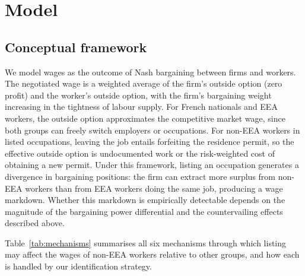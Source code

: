 \documentclass[9pt]{article}
\begin{document}
\section{Model}
\label{sec:model}

\subsection{Conceptual framework}

We model wages as the outcome of Nash bargaining between firms and workers.
The negotiated wage is a weighted average of the firm's outside option (zero profit)
and the worker's outside option, with the firm's bargaining weight increasing in the
tightness of labour supply. For French nationals and EEA workers, the outside option
approximates the competitive market wage, since both groups can freely switch
employers or occupations. For non-EEA workers in listed occupations, leaving the
job entails forfeiting the residence permit, so the effective outside option is
undocumented work or the risk-weighted cost of obtaining a new permit. Under this framework, listing an occupation generates
a divergence in bargaining positions: the firm can extract more surplus from non-EEA
workers than from EEA workers doing the same job, producing a wage markdown.
Whether this markdown is empirically detectable depends on the magnitude of the
bargaining power differential and the countervailing effects described above.

Table~\ref{tab:mechanisms} summarises all six mechanisms through which listing may
affect the wages of non-EEA workers relative to other groups, and how each is
handled by our identification strategy.
\end{document}
